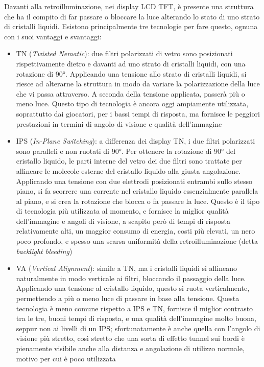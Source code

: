 Davanti alla retroilluminazione, nei display LCD TFT, è presente una struttura che ha il compito di far passare o bloccare la luce alterando lo stato di uno strato di cristalli liquidi. Esistono principalmente tre tecnologie per fare questo, ognuna con i suoi vantaggi e svantaggi:
\begin{itemize}
	\item TN (\textit{Twisted Nematic}): due filtri polarizzati di vetro sono posizionati rispettivamente dietro e davanti ad uno strato di cristalli liquidi, con una rotazione di 90°. Applicando una tensione allo strato di cristalli liquidi, si riesce ad alterarne la struttura in modo da variare la polarizzazione della luce che vi passa attraverso. A seconda della tensione applicata, passerà più o meno luce. Questo tipo di tecnologia è ancora oggi ampiamente utilizzata, soprattutto dai giocatori, per i bassi tempi di risposta, ma fornisce le peggiori prestazioni in termini di angolo di visione e qualità dell'immagine
	\item IPS (\textit{In-Plane Switching}): a differenza dei display TN, i due filtri polarizzati sono paralleli e non ruotati di 90°. Per ottenere la rotazione di 90° del cristallo liquido, le parti interne del vetro dei due filtri sono trattate per allineare le molecole esterne del cristallo liquido alla giusta angolazione. Applicando una tensione con due elettrodi posizionati entrambi sullo stesso piano, si fa scorrere una corrente nel cristallo liquido essenzialmente parallela al piano, e si crea la rotazione che blocca o fa passare la luce. Questo è il tipo di tecnologia più utilizzata al momento, e fornisce la miglior qualità dell'immagine e angoli di visione, a scapito però di tempi di risposta relativamente alti, un maggior consumo di energia, costi più elevati, un nero poco profondo, e spesso una scarsa uniformità della retroilluminazione (detta \textit{backlight bleeding})
	\item VA (\textit{Vertical Alignment}): simile a TN, ma i cristalli liquidi si allineano naturalmente in modo verticale ai filtri, bloccando il passaggio della luce. Applicando una tensione al cristallo liquido, questo si ruota verticalmente, permettendo a più o meno luce di passare in base alla tensione. Questa tecnologia è meno comune rispetto a IPS e TN, fornisce il miglior contrasto tra le tre, buoni tempi di risposta, e una qualità dell'immagine molto buona, seppur non ai livelli di un IPS; sfortunatamente è anche quella con l'angolo di visione più stretto, così stretto che una sorta di effetto tunnel sui bordi è pienamente visibile anche alla distanza e angolazione di utilizzo normale, motivo per cui è poco utilizzata
\end{itemize}

